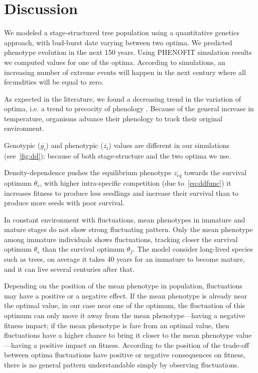 \label{sec:Disc}
\section*{Discussion}

We modeled a stage-structured tree population using a quantitative genetics approach, with bud-burst date varying between two optima. We predicted phenotype evolution in the next 150 years. Using \textsc{PHENOFIT} simulation results we computed values for one of the optima. According to simulations, an increasing number of extreme events will happen in the next century where all fecundities will be equal to zero.

As expected in the literature, we found a decreasing trend in the variation of optima, i.e. a trend to precocity of phenology \citep{aitken_adaptation_2008, ehrlen_timing_2009}. Because of the general increase in temperature, organisms advance their phenology to track their original environment.

Genotypic ($\overline{g_i}$) and phenotypic ($\overline{z_i}$) values are different in our simulations (see~\autoref{fig:dd}); because of both stage-structure and the two optima we use.

Density-dependence pushes the equilibrium phenotype $\overline{z_{eq}}$ towards the survival optimum $\theta_s$, with higher intra-specific competition (due to~\autoref{eq:ddfunc}) it increases fitness to produce less seedlings and increase their survival than to produce more seeds with poor survival.
	
In constant environment with fluctuations, mean phenotypes in immature and mature stages do not show strong fluctuating pattern. Only the mean phenotype among immature individuals shows fluctuations, tracking closer the survival optimum $\theta_s$ than the survival optimum $\theta_f$. The model consider long-lived species such as trees, on average it takes 40 years for an immature to become mature, and it can live several centuries after that.

Depending on the position of the mean phenotype in population, fluctuations may have a positive or a negative effect. If the mean phenotype is already near the optimal value, in our case near one of the optimum, the fluctuation of this optimum can only move it away from the mean phenotype—having a negative fitness impact; if the mean phenotype is fare from an optimal value, then fluctuations have a higher chance to bring it closer to the mean phenotype value—having a positive impact on fitness. According to the position of the trade-off between optima fluctuations have positive or negative consequences on fitness, there is no general pattern understandable simply by observing fluctuations.

